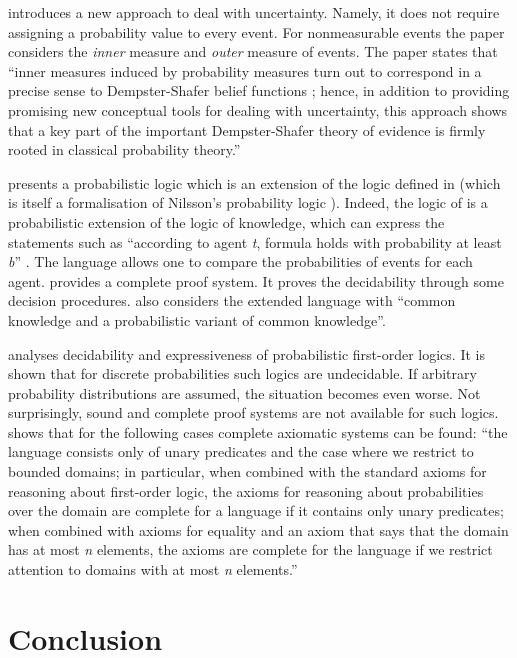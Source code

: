 \documentclass[11pt]{article}
\begin{document}
\cite{FH91} introduces a new approach to deal with uncertainty. Namely, it does not require assigning a probability value to every event. For nonmeasurable events the paper considers the \emph{inner} measure and \emph{outer} measure of events. The paper states that  ``inner measures induced by probability measures turn out to correspond in a precise sense to Dempster-Shafer belief functions \cite{Sha76}; hence, in addition to providing promising new conceptual tools for dealing with uncertainty, this approach shows that a key part of the important Dempster-Shafer theory of evidence is firmly rooted in classical probability theory.''

\cite{FH94} presents a probabilistic logic which is an extension of the logic defined in \cite{FHM90} (which is itself a formalisation of Nilsson's probability logic \cite{Nil86}). Indeed, the logic of \cite{FH94} is a probabilistic extension of the logic of knowledge, which can express the statements  such as ``according to agent \emph{t}, formula  holds with probability at least \emph{b}'' \cite{FHM90}. The language allows one to compare the probabilities of events for each agent. \cite{FH94} provides a complete proof system. It proves the decidability through some decision procedures. \cite{FH94} also considers the extended language with ``common knowledge and a probabilistic variant of common knowledge''.

 \cite{AH94} analyses decidability and expressiveness of probabilistic first-order logics. It is shown that for discrete probabilities such logics are undecidable.  If arbitrary probability distributions are assumed, the situation becomes even worse. Not surprisingly, sound and complete proof systems are not available for such logics. \cite{AH94} shows that for the following cases complete axiomatic systems can be found: ``the language consists only of unary predicates and the case where we restrict to bounded domains; in particular, when combined with the standard axioms for reasoning about first-order logic, the axioms for reasoning about probabilities over the domain are complete for a language if it contains only unary predicates; when combined with axioms for equality and an axiom that says that the domain has at most \emph{n} elements, the axioms are complete for the language if we restrict attention to domains with at most \emph{n} elements.''

\section{Conclusion} \label{sec:conclusion}
\end{document}
